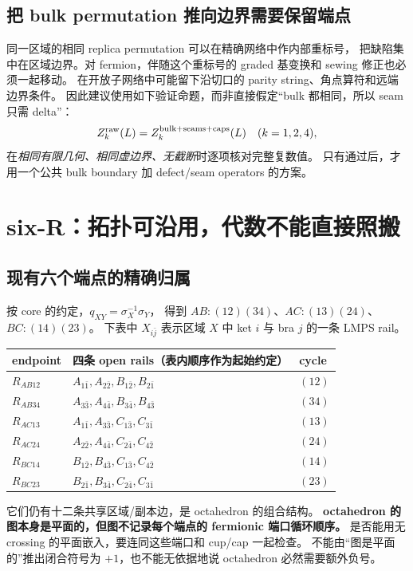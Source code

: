 \documentclass[11pt]{article}
\begin{document}
\subsection{把 bulk permutation 推向边界需要保留端点}

同一区域的相同 replica permutation 可以在精确网络中作内部重标号，
把缺陷集中在区域边界。对 fermion，伴随这个重标号的 graded 基变换和 sewing 修正也必须一起移动。
在开放子网络中可能留下沿切口的 parity string、角点算符和远端边界条件。
因此建议使用如下验证命题，而非直接假定“bulk 都相同，所以 seam 只需 delta”：
\begin{equation}
 Z_k^{\rm raw}(L)=Z_k^{\rm bulk+seams+caps}(L)
 \quad(k=1,2,4),\label{eq:finiteidentity}
\end{equation}
在\emph{相同有限几何、相同虚边界、无截断}时逐项核对完整复数值。
只有通过后，才用一个公共 bulk boundary 加 defect/seam operators 的方案。

\section{six-R：拓扑可沿用，代数不能直接照搬}
\subsection{现有六个端点的精确归属}

按 core 的约定，$q_{XY}=\sigma_X^{-1}\sigma_Y$，
得到 $AB:(12)(34)$、$AC:(13)(24)$、$BC:(14)(23)$。
下表中 $X_{i\bar j}$ 表示区域 $X$ 中 ket $i$ 与 bra $j$ 的一条 LMPS rail。
\begin{center}\small
\begin{tabular}{lll}\toprule
endpoint & 四条 open rails（表内顺序作为起始约定） & cycle\\\midrule
$R_{AB12}$ & $A_{1\bar1},A_{2\bar2},B_{1\bar2},B_{2\bar1}$ & $(12)$\\
$R_{AB34}$ & $A_{3\bar3},A_{4\bar4},B_{3\bar4},B_{4\bar3}$ & $(34)$\\
$R_{AC13}$ & $A_{1\bar1},A_{3\bar3},C_{1\bar3},C_{3\bar1}$ & $(13)$\\
$R_{AC24}$ & $A_{2\bar2},A_{4\bar4},C_{2\bar4},C_{4\bar2}$ & $(24)$\\
$R_{BC14}$ & $B_{1\bar2},B_{4\bar3},C_{1\bar3},C_{4\bar2}$ & $(14)$\\
$R_{BC23}$ & $B_{2\bar1},B_{3\bar4},C_{2\bar4},C_{3\bar1}$ & $(23)$\\\bottomrule
\end{tabular}
\end{center}
它们仍有十二条共享区域/副本边，是 octahedron 的组合结构。
\textbf{octahedron 的图本身是平面的，但图不记录每个端点的 fermionic 端口循环顺序。}
是否能用无 crossing 的平面嵌入，要连同这些端口和 cup/cap 一起检查。
不能由“图是平面的”推出闭合符号为 $+1$，也不能无依据地说 octahedron 必然需要额外负号。
\end{document}

